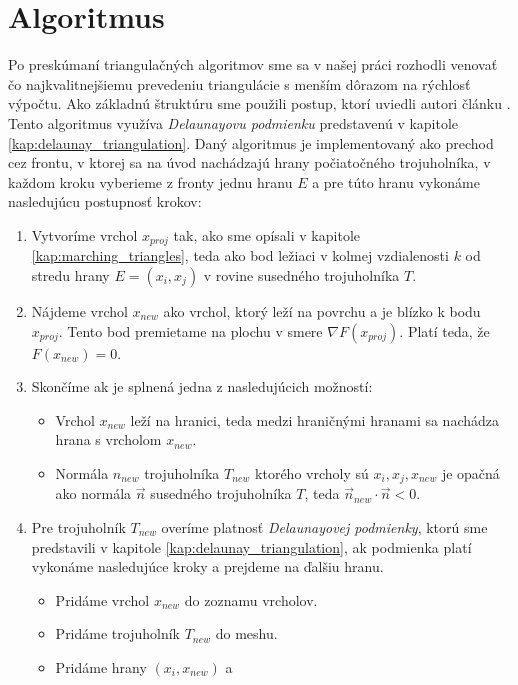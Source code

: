 \chapter{Algoritmus}
\label{kap:algoritmus}
Po preskúmaní triangulačných algoritmov sme sa v našej práci rozhodli venovať čo najkvalitnejšiemu
prevedeniu triangulácie s menším dôrazom na rýchlosť výpočtu. Ako základnú štruktúru sme použili 
postup, ktorí uviedli autori článku \cite{hilton1996marching}. Tento algoritmus využíva 
\textit{Delaunayovu podmienku} predstavenú v kapitole \ref{kap:delaunay_triangulation}.
Daný algoritmus je implementovaný ako prechod cez frontu, v ktorej sa na úvod nachádzajú
hrany počiatočného trojuholníka, v každom kroku vyberieme z fronty jednu hranu $E$ a pre túto
hranu vykonáme nasledujúcu postupnosť krokov:
\begin{enumerate}
    \item{Vytvoríme vrchol $x_{proj}$ tak, ako sme opísali v kapitole \ref{kap:marching_triangles}, teda 
    ako bod ležiaci v kolmej vzdialenosti $k$ od stredu hrany $E = (x_i, x_j)$ 
    v rovine susedného trojuholníka $T$.}
    \item{Nájdeme vrchol $x_{new}$ ako vrchol, ktorý leží na povrchu a je blízko k bodu 
    $x_{proj}$. Tento bod premietame na plochu v smere $\nabla F(x_{proj})$.
    Platí teda, že $F(x_{new}) = 0$.}
    \item{Skončíme ak je splnená jedna z nasledujúcich možností:
    \begin{itemize}
        \item{Vrchol $x_{new}$ leží na hranici, teda medzi hraničnými 
        hranami sa nachádza hrana s vrcholom $x_{new}$.}
        \item{Normála $n_{new}$ trojuholníka $T_{new}$ ktorého vrcholy sú $x_i, 
        x_j, x_{new}$ je opačná ako
        normála $\vec{n}$ susedného trojuholníka $T$, teda 
        $\vec{n}_{new} \cdot \vec{n} < 0$.}
    \end{itemize}
    }
    \item{Pre trojuholník $T_{new}$ overíme platnosť \textit{Delaunayovej podmienky}, 
    ktorú sme predstavili v kapitole \ref{kap:delaunay_triangulation}, ak podmienka platí
    vykonáme nasledujúce kroky a prejdeme na ďalšiu hranu.
    \begin{itemize}
        \item{Pridáme vrchol $x_{new}$ do zoznamu vrcholov.}
        \item{Pridáme trojuholník $T_{new}$ do meshu.}
        \item{Pridáme hrany $(x_i, x_{new})$ a 
}
\end{itemize}}
\end{enumerate}
